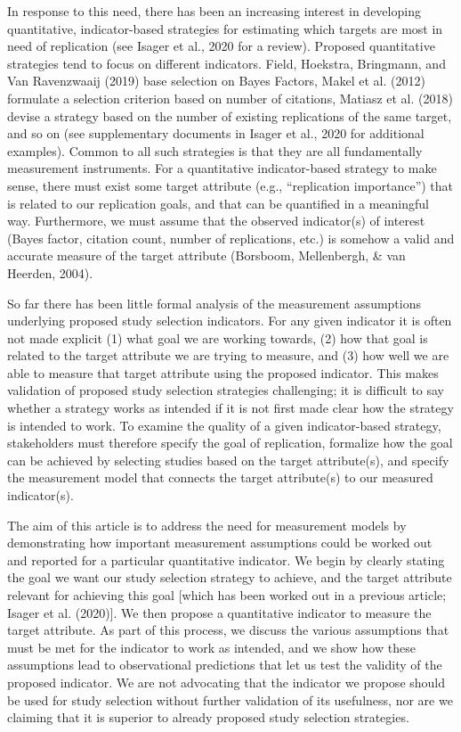 \documentclass[
  english,
  jou,floatsintext]{apa6}
\begin{document}
In response to this need, there has been an increasing interest in developing quantitative, indicator-based strategies for estimating which targets are most in need of replication (see Isager et al., 2020 for a review). Proposed quantitative strategies tend to focus on different indicators. Field, Hoekstra, Bringmann, and Van Ravenzwaaij (2019) base selection on Bayes Factors, Makel et al. (2012) formulate a selection criterion based on number of citations, Matiasz et al. (2018) devise a strategy based on the number of existing replications of the same target, and so on (see supplementary documents in Isager et al., 2020 for additional examples). Common to all such strategies is that they are all fundamentally measurement instruments. For a quantitative indicator-based strategy to make sense, there must exist some target attribute (e.g., ``replication importance'') that is related to our replication goals, and that can be quantified in a meaningful way. Furthermore, we must assume that the observed indicator(s) of interest (Bayes factor, citation count, number of replications, etc.) is somehow a valid and accurate measure of the target attribute (Borsboom, Mellenbergh, \& van Heerden, 2004).

So far there has been little formal analysis of the measurement assumptions underlying proposed study selection indicators. For any given indicator it is often not made explicit (1) what goal we are working towards, (2) how that goal is related to the target attribute we are trying to measure, and (3) how well we are able to measure that target attribute using the proposed indicator. This makes validation of proposed study selection strategies challenging; it is difficult to say whether a strategy works as intended if it is not first made clear how the strategy is intended to work. To examine the quality of a given indicator-based strategy, stakeholders must therefore specify the goal of replication, formalize how the goal can be achieved by selecting studies based on the target attribute(s), and specify the measurement model that connects the target attribute(s) to our measured indicator(s).

The aim of this article is to address the need for measurement models by demonstrating how important measurement assumptions could be worked out and reported for a particular quantitative indicator. We begin by clearly stating the goal we want our study selection strategy to achieve, and the target attribute relevant for achieving this goal {[}which has been worked out in a previous article; Isager et al. (2020){]}. We then propose a quantitative indicator to measure the target attribute. As part of this process, we discuss the various assumptions that must be met for the indicator to work as intended, and we show how these assumptions lead to observational predictions that let us test the validity of the proposed indicator. We are not advocating that the indicator we propose should be used for study selection without further validation of its usefulness, nor are we claiming that it is superior to already proposed study selection strategies.
\end{document}

